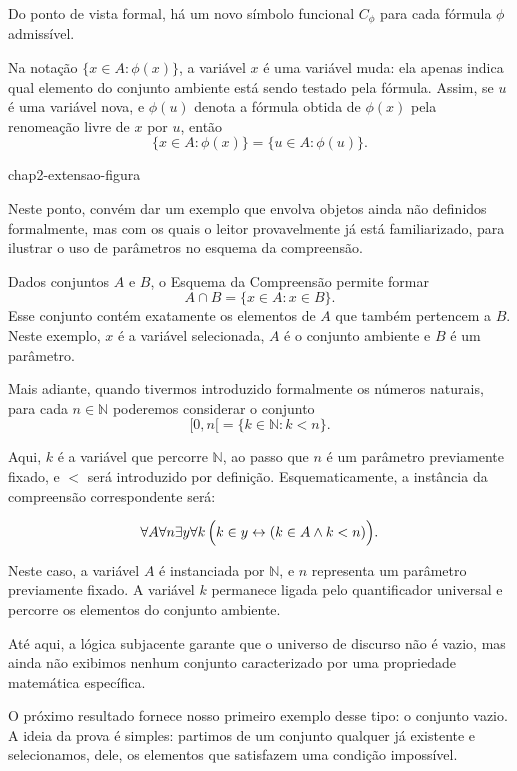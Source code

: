 Do ponto de vista formal, há um novo símbolo funcional $C_\phi$ para cada fórmula
$\phi$ admissível.

Na notação $\{x\in A:\phi(x)\}$, a variável $x$ é uma variável muda:
ela apenas indica qual elemento do conjunto ambiente está sendo testado pela fórmula.
Assim, se $u$ é uma variável nova, e $\phi(u)$ denota a fórmula obtida de $\phi(x)$
pela renomeação livre de $x$ por $u$, então
\[
\{x\in A:\phi(x)\}=\{u\in A:\phi(u)\}.
\]

{chap2-extensao-figura}

Neste ponto, convém dar um exemplo que envolva objetos ainda não definidos formalmente, mas com os quais o leitor provavelmente já está familiarizado, para ilustrar o uso de parâmetros no esquema da compreensão.

\begin{example}[$\BST$]
    Dados conjuntos $A$ e $B$, o Esquema da Compreensão permite formar
    \[
    A\cap B=\{x\in A:x\in B\}.
    \]
    Esse conjunto contém exatamente os elementos de $A$ que também pertencem a $B$.
    Neste exemplo, $x$ é a variável selecionada, $A$ é o conjunto ambiente e $B$ é um
    parâmetro.
\end{example}

\begin{example}[$\BST$]
    Mais adiante, quando tivermos introduzido formalmente os números naturais, para cada $n \in \mathbb{N}$ poderemos considerar o conjunto
    \[
        [0, n[ = \{k \in \mathbb{N} : k < n\}.
    \]

    Aqui, $k$ é a variável que percorre $\mathbb{N}$, ao passo que $n$ é um parâmetro previamente fixado, e $<$ será introduzido por definição.
    Esquematicamente, a instância da compreensão correspondente será:

    \[
        \forall A \forall n \exists y \forall k\,
        \Bigl(k \in y \leftrightarrow (k \in A \land k < n)\Bigr).
    \]

    Neste caso, a variável $A$ é instanciada por $\mathbb{N}$, e $n$ representa um parâmetro previamente fixado.
    A variável $k$ permanece ligada pelo quantificador universal e percorre os elementos do conjunto ambiente.
\end{example}

Até aqui, a lógica subjacente garante que o universo de discurso não é vazio,
mas ainda não exibimos nenhum conjunto caracterizado por uma propriedade matemática
específica.

O próximo resultado fornece nosso primeiro exemplo desse tipo: o conjunto vazio.
A ideia da prova é simples: partimos de um conjunto qualquer já existente e selecionamos, dele, os elementos que satisfazem uma condição impossível.

